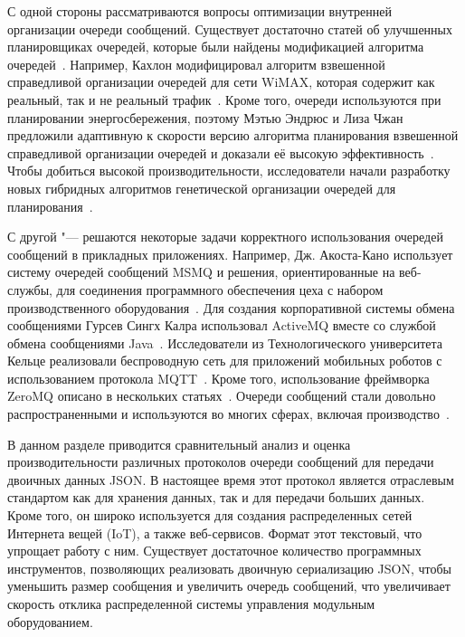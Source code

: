 С одной стороны рассматриваются вопросы оптимизации внутренней организации очереди сообщений. Существует достаточно статей об улучшенных планировщиках очередей, которые были найдены модификацией алгоритма очередей~\cite{Valente201416, Rizzo201534}. Например, Кахлон модифицировал алгоритм взвешенной справедливой организации очередей для сети WiMAX, которая содержит как реальный, так и не реальный трафик~\cite{Kahlon2016357}. Кроме того, очереди используются при планировании энергосбережения, поэтому Мэтью Эндрюс и Лиза Чжан предложили адаптивную к скорости версию алгоритма планирования взвешенной справедливой организации очередей и доказали её высокую эффективность~\cite{Andrews2014247}. Чтобы добиться высокой производительности, исследователи начали разработку новых гибридных алгоритмов генетической организации очередей для планирования~\cite{Rashidi2017331, Kahlon2016357}.

С другой "--- решаются некоторые задачи корректного использования очередей сообщений в прикладных приложениях. Например, Дж. Акоста-Кано использует систему очередей сообщений MSMQ и решения, ориентированные на веб-службы, для соединения программного обеспечения цеха с набором производственного оборудования~\cite{AcostaCano2013447}. Для создания корпоративной системы обмена сообщениями Гурсев Сингх Калра использовал ActiveMQ вместе со службой обмена сообщениями Java~\cite{Kalra20147}. Исследователи из Технологического университета Кельце реализовали беспроводную сеть для приложений мобильных роботов с использованием протокола MQTT~\cite{KAZALA2015231}. Кроме того, использование фреймворка ZeroMQ описано в нескольких статьях~\cite{KIRILL2015278, GOERTZEL2014158, ANDREEV201533}. Очереди сообщений стали довольно распространенными и используются во многих сферах, включая производство~\cite{STOCK2014320, MORARIU20121850}.

В данном разделе приводится сравнительный анализ и оценка производительности различных протоколов очереди сообщений для передачи двоичных данных JSON. В настоящее время этот протокол является отраслевым стандартом как для хранения данных, так и для передачи больших данных. Кроме того, он широко используется для создания распределенных сетей Интернета вещей (IoT), а также веб-сервисов. Формат этот текстовый, что упрощает работу с ним. Существует достаточное количество программных инструментов, позволяющих реализовать двоичную сериализацию JSON, чтобы уменьшить размер сообщения и увеличить очередь сообщений, что увеличивает скорость отклика распределенной системы управления модульным оборудованием.

